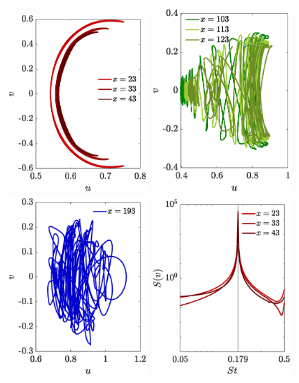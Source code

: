 \begin{figure}
\centering
\includegraphics[width=0.328\textwidth]{./fig/appendix/uv_xw_AR6_Re450_a.eps}
\includegraphics[width=0.328\textwidth]{./fig/appendix/uv_xw_AR6_Re450_b.eps}
\includegraphics[width=0.328\textwidth]{./fig/appendix/uv_xw_AR6_Re450_c.eps}
\includegraphics[width=0.328\textwidth]{./fig/appendix/Spec_AR6_Re450_a.eps}

\end{figure}
